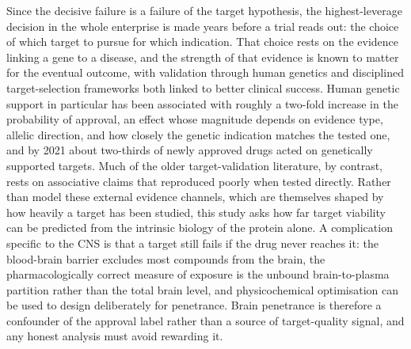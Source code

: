\documentclass[11pt,twocolumn]{article}
\begin{document}
Since the decisive failure is a failure of the target hypothesis, the highest-leverage decision in the whole enterprise is made years before a trial reads out: the choice of which target to pursue for which indication. That choice rests on the evidence linking a gene to a disease, and the strength of that evidence is known to matter for the eventual outcome, with validation through human genetics and disciplined target-selection frameworks both linked to better clinical success.\cite{ref18,ref19} Human genetic support in particular has been associated with roughly a two-fold increase in the probability of approval,\cite{ref20,ref21} an effect whose magnitude depends on evidence type, allelic direction, and how closely the genetic indication matches the tested one,\cite{ref22} and by 2021 about two-thirds of newly approved drugs acted on genetically supported targets.\cite{ref23} Much of the older target-validation literature, by contrast, rests on associative claims that reproduced poorly when tested directly.\cite{ref24,ref25} Rather than model these external evidence channels, which are themselves shaped by how heavily a target has been studied, this study asks how far target viability can be predicted from the intrinsic biology of the protein alone. A complication specific to the CNS is that a target still fails if the drug never reaches it: the blood-brain barrier excludes most compounds from the brain,\cite{ref26} the pharmacologically correct measure of exposure is the unbound brain-to-plasma partition rather than the total brain level,\cite{ref27} and physicochemical optimisation can be used to design deliberately for penetrance.\cite{ref28} Brain penetrance is therefore a confounder of the approval label rather than a source of target-quality signal, and any honest analysis must avoid rewarding it.
\end{document}
